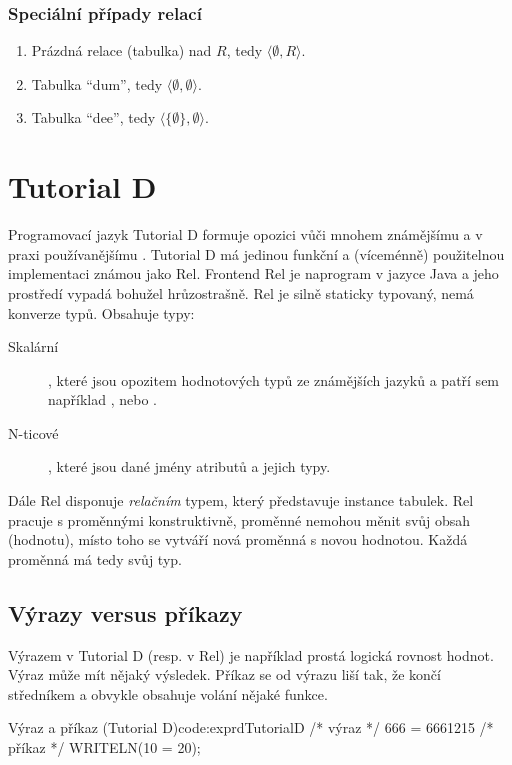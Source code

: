 \subsubsection{Speciální případy relací}
\begin{enumerate}
\item Prázdná relace (tabulka) nad $R$, tedy $\langle \emptyset, R \rangle$.
\item Tabulka \enquote{dum}, tedy $\langle \emptyset, \emptyset \rangle$.
\item Tabulka \enquote{dee}, tedy $\langle \lbrace \emptyset \rbrace, \emptyset \rangle$.
\end{enumerate}

\section{Tutorial D}
Programovací jazyk Tutorial D formuje opozici vůči mnohem známějšímu a v praxi používanějšímu . Tutorial D má jedinou funkční a (víceménně) použitelnou implementaci známou jako Rel. Frontend Rel je naprogram v jazyce Java a jeho prostředí vypadá bohužel hrůzostrašně. Rel je silně staticky typovaný, nemá konverze typů. Obsahuje typy:
\begin{description}
\item[Skalární], které jsou opozitem hodnotových typů ze známějších jazyků a patří sem například ,  nebo .
\item[N-ticové], které jsou dané jmény atributů a jejich typy.
\end{description}
Dále Rel disponuje \textit{relačním} typem, který představuje instance tabulek. Rel pracuje s proměnnými konstruktivně, proměnné nemohou měnit svůj obsah (hodnotu), místo toho se vytváří nová proměnná s novou hodnotou. Každá proměnná má tedy svůj typ.

\subsection{Výrazy versus příkazy}
Výrazem v Tutorial D (resp. v Rel) je například prostá logická rovnost hodnot. Výraz může mít nějaký výsledek. Příkaz se od výrazu liší tak, že končí středníkem a obvykle obsahuje volání nějaké funkce.
\begin{upcode}{Výraz a příkaz (Tutorial D)}{code:exprd}{TutorialD}
/* výraz */
666 = 6661215
/* příkaz */
WRITELN(10 = 20);
\end{upcode}

